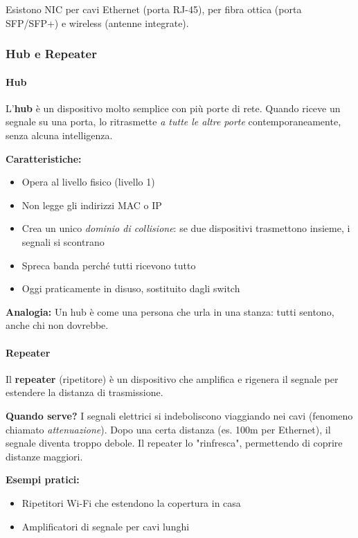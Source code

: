 \documentclass[12pt,a4paper]{article}
\begin{document}
Esistono NIC per cavi Ethernet (porta RJ-45), per fibra ottica (porta SFP/SFP+) e wireless (antenne integrate).

\subsubsection{Hub e Repeater}

\paragraph{Hub}
L'\textbf{hub} è un dispositivo molto semplice con più porte di rete. Quando riceve un segnale su una porta, lo ritrasmette \textit{a tutte le altre porte} contemporaneamente, senza alcuna intelligenza.

\textbf{Caratteristiche:}
\begin{itemize}
    \item Opera al livello fisico (livello 1)
    \item Non legge gli indirizzi MAC o IP
    \item Crea un unico \textit{dominio di collisione}: se due dispositivi trasmettono insieme, i segnali si scontrano
    \item Spreca banda perché tutti ricevono tutto
    \item Oggi praticamente in disuso, sostituito dagli switch
\end{itemize}

\textbf{Analogia:} Un hub è come una persona che urla in una stanza: tutti sentono, anche chi non dovrebbe.

\paragraph{Repeater}
Il \textbf{repeater} (ripetitore) è un dispositivo che amplifica e rigenera il segnale per estendere la distanza di trasmissione.

\textbf{Quando serve?} I segnali elettrici si indeboliscono viaggiando nei cavi (fenomeno chiamato \textit{attenuazione}). Dopo una certa distanza (es. 100m per Ethernet), il segnale diventa troppo debole. Il repeater lo "rinfresca", permettendo di coprire distanze maggiori.

\textbf{Esempi pratici:}
\begin{itemize}
    \item Ripetitori Wi-Fi che estendono la copertura in casa
    \item Amplificatori di segnale per cavi lunghi
\end{itemize}
\end{document}
